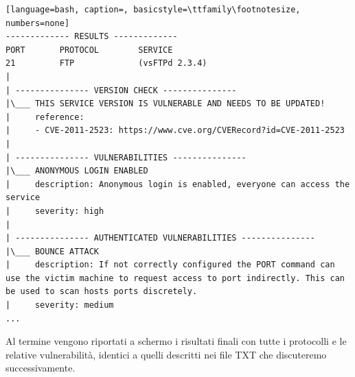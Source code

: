 \documentclass[12pt]{report}
\begin{document}
\begin{lstlisting}[language=bash, caption=, basicstyle=\ttfamily\footnotesize, numbers=none]
------------- RESULTS -------------                                                                                                                                                                                  
PORT       PROTOCOL        SERVICE                                                                                                                                                                                   
21         FTP             (vsFTPd 2.3.4)                                                                                                                                                                            
|                                                                                                                                                                                                                    
| --------------- VERSION CHECK ---------------                                                                                                                                                                      
|\___ THIS SERVICE VERSION IS VULNERABLE AND NEEDS TO BE UPDATED!                                                                                                                                                    
|     reference:                                                                                                                                                                                                     
|     - CVE-2011-2523: https://www.cve.org/CVERecord?id=CVE-2011-2523                                                                                                                                                
|                                                                                                                                                                                                                    
| --------------- VULNERABILITIES ---------------
|\___ ANONYMOUS LOGIN ENABLED
|     description: Anonymous login is enabled, everyone can access the service
|     severity: high
|
| --------------- AUTHENTICATED VULNERABILITIES ---------------
|\___ BOUNCE ATTACK
|     description: If not correctly configured the PORT command can use the victim machine to request access to port indirectly. This can be used to scan hosts ports discretely.
|     severity: medium
...
\end{lstlisting}

Al termine vengono riportati a schermo i risultati finali con tutte i protocolli e le relative vulnerabilità, identici a quelli descritti nei file TXT che discuteremo successivamente.\\\\
\end{document}

